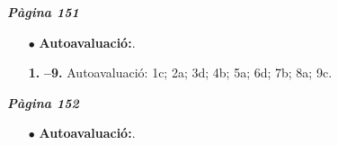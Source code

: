 \documentclass[a4paper, pdf, twoside]{book}
\begin{document}
\begin{multicols}{2}

{\textbf{\em Pàgina 151}} \hrulefill
\begin{enumerate}
\vspace{0.25cm}
 \item[$\bullet$ ] {\selectfont\color{blue}\textbf{Autoavaluació:}. }

 \end{enumerate}
\begin{enumerate}
\vspace{0.25cm}
\item[\fontfamily{phv}\selectfont\color{blue}\textbf{1. }]  \scalebox{0.6}{\simbolclau } 
\textbf {--9.} Autoavaluació: 1c; 2a; 3d; 4b; 5a; 6d; 7b; 8a; 9c.
 \end{enumerate}
\vspace{0.3cm}


{\textbf{\em Pàgina 152}} \hrulefill
\begin{enumerate}
\vspace{0.25cm}
 \item[$\bullet$ ] {\selectfont\color{blue}\textbf{Autoavaluació:}. }

 \end{enumerate}
\vfill\null
\columnbreak
\def\currentname{Solucions del Tema 12}
\vspace*{0.75cm}

 

\vspace*{0.4cm}
 {}
\vspace{0.3cm}



\end{multicols}
\end{document}

